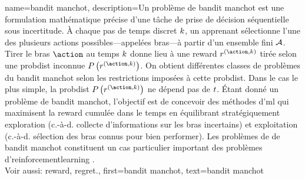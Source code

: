 {name={bandit manchot},
	description={Un problème de bandit manchot est une formulation mathématique précise d'une tâche de prise de décision séquentielle sous incertitude. À chaque pas de temps discret $k$, un apprenant sélectionne l’une des plusieurs actions possibles—appelées bras—à partir d’un ensemble fini $\mathcal{A}$. Tirer le bras $\action$ au temps $k$ donne lieu à une \gls{reward} $\reward^{(\action,\iteridx)}$ tirée selon une \gls{probdist} inconnue $\prob{\reward^{(\action,\iteridx)}}$. On obtient différentes classes de problèmes du bandit manchot selon les restrictions imposées à cette \gls{probdist}. Dans le cas le plus simple, la \gls{probdist} $\prob{\reward^{(\action,\iteridx)}}$ ne dépend pas de $t$. Étant donné un problème de bandit manchot, l’objectif est de concevoir des méthodes d’\gls{ml} qui maximisent la \gls{reward} cumulée dans le temps en équilibrant stratégiquement exploration (c.-à-d. collecte d’informations sur les bras incertains) et exploitation (c.-à-d. sélection des bras connus pour bien performer). Les problèmes de de bandit manchot constituent un cas particulier important des problèmes d’\gls{reinforcementlearning} \cite{SuttonEd2, Bubeck2012}.
		\\
		Voir aussi: \gls{reward}, \gls{regret}.},
	first={bandit manchot},
	text={bandit manchot}
}

